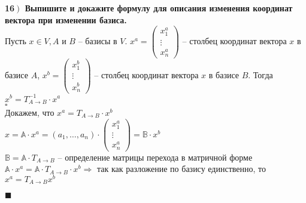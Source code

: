 \documentclass[a4paper,12pt]{article}
\begin{document}
    \textbf{16$\left.\right)$ Выпишите и докажите формулу для описания изменения координат вектора при изменении базиса.}\\Пусть $x\in V, A$ и $B$ -- базисы в $V$. $x^a=\begin{pmatrix}
                                                                                                                                                                             x_1^a  \\
                                                                                                                                                                             \vdots \\
                                                                                                                                                                             x_n^a
    \end{pmatrix}$ -- столбец координат вектора $x$ в базисе $A$, $x^b=\begin{pmatrix}
                                                                           x_1^b  \\
                                                                           \vdots \\
                                                                           x_n^b
    \end{pmatrix}$ -- столбец координат вектора $x$ в базисе $B$. Тогда $x^b=T_{A\rightarrow B}^{-1}\cdot x^a$\\
    $\square$\\
    Докажем, что $x^a=T_{A\rightarrow B}\cdot x^b$\\
    $x=\mathbb{A}\cdot x^a=(a_1, \ldots, a_n)\cdot\begin{pmatrix}
                                                      x_1^a  \\
                                                      \vdots \\
                                                      x_n^a
    \end{pmatrix}=\mathbb{B}\cdot x^b$\\
    $\mathbb{B}=\mathbb{A}\cdot T_{A\rightarrow B}$ -- определение матрицы перехода в матричной форме\\
    $\mathbb{A}\cdot x^a=\mathbb{A}\cdot T_{A\rightarrow B}\cdot x^b\Rightarrow$ так как разложение по базису единственно, то $x^a=T_{A\rightarrow B}x^b$
    \begin{flushright}
        $\blacksquare$
    \end{flushright}
\end{document}
